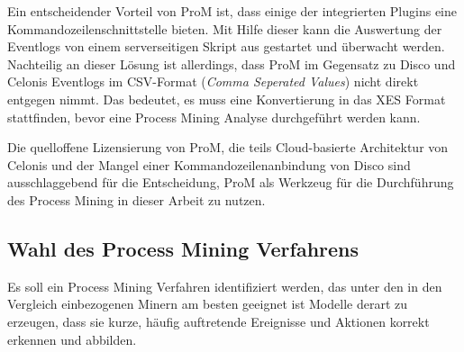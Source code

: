 \begin{table}[!h]
\centering
{}
\caption{Gegenüberstellung von technischen Eigenschaften der populärsten Process Mining Lösungen(Quelle: Erling C., Vergleich und Evaluation von Process Mining Software, 2019, S. 36,37,44,83 [\ref{comparison2}])}
\label{comparison2}
\end{table}

Ein entscheidender Vorteil von ProM ist, dass einige der integrierten Plugins eine Kommandozeilenschnittstelle bieten. Mit Hilfe dieser kann die Auswertung der Eventlogs von einem serverseitigen Skript aus gestartet und überwacht werden. Nachteilig an dieser Lösung ist allerdings, dass ProM im Gegensatz zu Disco und Celonis Eventlogs im CSV-Format (\textit{Comma Seperated Values}) nicht direkt entgegen nimmt. Das bedeutet, es muss eine Konvertierung in das XES Format stattfinden, bevor eine Process Mining Analyse durchgeführt werden kann.

Die quelloffene Lizensierung von ProM, die teils Cloud-basierte Architektur von Celonis und der Mangel einer Kommandozeilenanbindung von Disco sind ausschlaggebend für die Entscheidung, ProM als Werkzeug für die Durchführung des Process Mining in dieser Arbeit zu nutzen. 

\subsection{Wahl des Process Mining Verfahrens}
Es soll ein Process Mining Verfahren identifiziert werden, das unter den in den Vergleich einbezogenen Minern am besten geeignet ist Modelle derart zu erzeugen, dass sie kurze, häufig auftretende Ereignisse und Aktionen korrekt erkennen und abbilden. 

